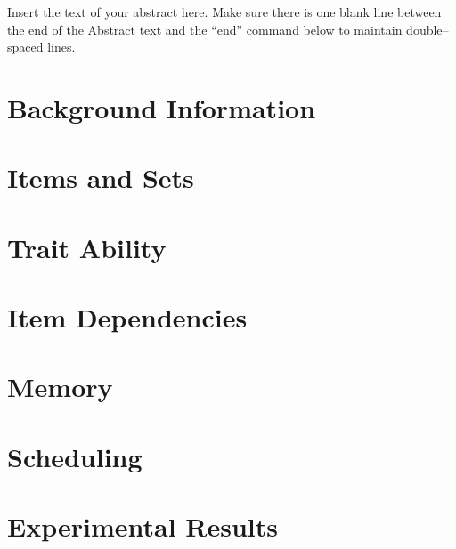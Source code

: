 \documentclass[12pt,letterpaper]{lsuetd}
\begin{document}
\renewenvironment{abstract}{{\hspace{-2.2em} \huge \textbf{\abstractname}} \par}{\pagebreak}
\begin{abstract}
\vspace{0.55ex}
\doublespacing
Insert the text of your abstract here.  Make sure there is one blank line between the end of the Abstract text and the ``end'' command below to maintain double--spaced lines.

\end{abstract}

\singlespacing
\setlength{\textfloatsep}{12pt plus 2pt minus 2pt}
\setlength{\intextsep}{6pt plus 2pt minus 2pt}
\chapter{Background Information}
\doublespacing

\pagebreak
\singlespacing
\chapter{Items and Sets}
\doublespacing

\pagebreak
\singlespacing
\chapter{Trait Ability}
\doublespacing

\pagebreak
\singlespacing
\chapter{Item Dependencies}
\doublespacing

\pagebreak
\singlespacing
\chapter{Memory}
\doublespacing

\pagebreak
\singlespacing
\chapter{Scheduling}
\doublespacing

\pagebreak
\singlespacing
\chapter{Experimental Results}
\doublespacing

\pagebreak
\singlespacing
\end{document}
